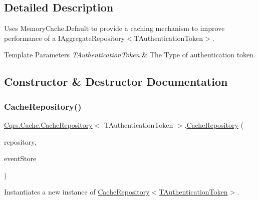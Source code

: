 \subsection{Detailed Description}
Uses Memory\+Cache.\+Default to provide a caching mechanism to improve performance of a I\+Aggregate\+Repository$<$\+T\+Authentication\+Token$>$. 


\begin{DoxyTemplParams}{Template Parameters}
{\em T\+Authentication\+Token} & The Type of authentication token.\\
\hline
\end{DoxyTemplParams}


\subsection{Constructor \& Destructor Documentation}
\mbox{\label{classCqrs_1_1Cache_1_1CacheRepository_a6c567e999a85f5803a920ce4912833a9_a6c567e999a85f5803a920ce4912833a9}} 
\subsubsection{\texorpdfstring{Cache\+Repository()}{CacheRepository()}}
{\footnotesize\ttfamily \hyperlink{classCqrs_1_1Cache_1_1CacheRepository}{Cqrs.\+Cache.\+Cache\+Repository}$<$ T\+Authentication\+Token $>$.\hyperlink{classCqrs_1_1Cache_1_1CacheRepository}{Cache\+Repository} (\begin{DoxyParamCaption}\item[{\hyperlink{interfaceCqrs_1_1Domain_1_1IAggregateRepository}{I\+Aggregate\+Repository}$<$ T\+Authentication\+Token $>$}]{repository,  }\item[{\hyperlink{interfaceCqrs_1_1Events_1_1IEventStore}{I\+Event\+Store}$<$ T\+Authentication\+Token $>$}]{event\+Store }\end{DoxyParamCaption})}



Instantiates a new instance of \hyperlink{classCqrs_1_1Cache_1_1CacheRepository_a6c567e999a85f5803a920ce4912833a9_a6c567e999a85f5803a920ce4912833a9}{Cache\+Repository$<$\+T\+Authentication\+Token$>$}. 



